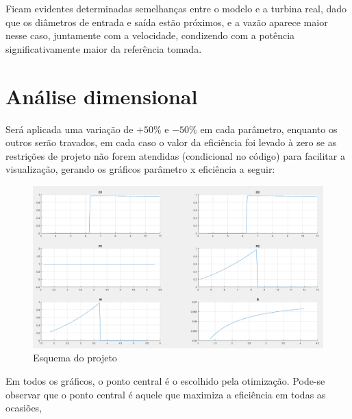 Ficam evidentes determinadas semelhanças entre o modelo e a turbina real, dado que os diâmetros de entrada e saída estão próximos, e a vazão aparece maior nesse caso, juntamente com a velocidade, condizendo com a potência significativamente maior da referência tomada.

\section{Análise dimensional}

Será aplicada uma variação de $+50\%$ e $-50\%$ em cada parâmetro, enquanto os outros serão travados, em cada caso o valor da eficiência foi levado à zero se as restrições de projeto não forem atendidas (condicional no código) para facilitar a visualização, gerando os gráficos parâmetro x eficiência a seguir:

\begin{figure}[!h]
    \centering
    \includegraphics[width=1\textwidth]{figuras/bundled_graphs.jpg}
    \caption{Esquema do projeto}
    \label{fig:graphs}
\end{figure}

Em todos os gráficos, o ponto central é o escolhido pela otimização. Pode-se observar que o ponto central é aquele que maximiza a eficiência em todas as ocasiões, 
